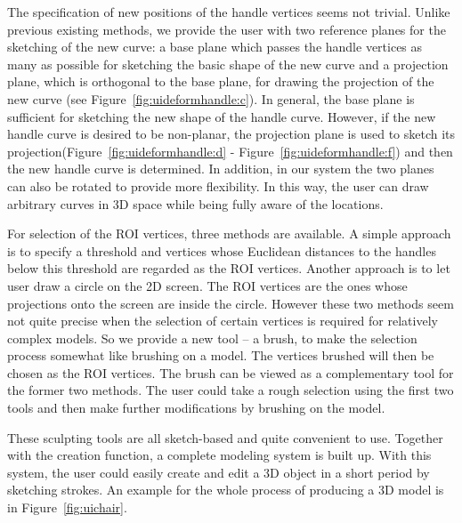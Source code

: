 The specification of new positions of the handle vertices seems not trivial. Unlike previous existing methods, we provide the user with two reference planes for the sketching of the new curve: a base plane which passes the handle vertices as many as possible for sketching the basic shape of the new curve and a projection plane, which is orthogonal to the base plane, for drawing the projection of the new curve (see Figure~\ref{fig:uideformhandle:c}). In general, the base plane is sufficient for sketching the new shape of the handle curve. However, if the new handle curve is desired to be non-planar, the projection plane is used to sketch its projection(Figure~\ref{fig:uideformhandle:d} - Figure~\ref{fig:uideformhandle:f}) and then the new handle curve is determined. In addition, in our system the two planes can also be rotated to provide more flexibility. In this way, the user can draw arbitrary curves in 3D space while being fully aware of the locations.

For selection of the ROI vertices, three methods are available. A simple approach is to specify a threshold and vertices whose Euclidean distances to the handles below this threshold are regarded as the ROI vertices. Another approach is to let user draw a circle on the 2D screen. The ROI vertices are the ones whose projections onto the screen are inside the circle. However these two methods seem not quite precise when the selection of certain vertices is required for relatively complex models. So we provide a new tool -- a brush, to make the selection process somewhat like brushing on a model. The vertices brushed will then be chosen as the ROI vertices. The brush can be viewed as a complementary tool for the former two methods. The user could take a rough selection using the first two tools and then make further modifications by brushing on the model.

These sculpting tools are all sketch-based and quite convenient to use. Together with the creation function, a complete modeling system is built up. With this system, the user could easily create and edit a 3D object in a short period by sketching strokes. An example for the whole process of producing a 3D model is in Figure~\ref{fig:uichair}.

